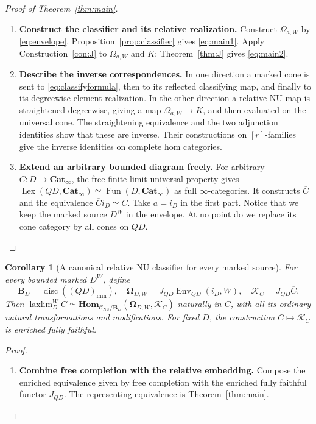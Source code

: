 \documentclass[oneside]{article}
\theoremstyle{plain}
\newtheorem{corollary}[theorem]{Corollary}
\theoremstyle{definition}
\theoremstyle{remark}
\newcommand{\B}{\mathbf B}
\newcommand{\CNU}{\mathcal C_{\mathrm{NU}}}
\newcommand{\Cat}{\mathbf{Cat}_{\infty}}
\newcommand{\Env}{\operatorname{Env}}
\newcommand{\Fun}{\operatorname{Fun}}
\newcommand{\Homc}{\mathbf{Hom}}
\newcommand{\J}{J}
\newcommand{\Lex}{\operatorname{Lex}}
\newcommand{\Om}{\boldsymbol\Omega}
\newcommand{\cK}{\mathcal K}
\newcommand{\disc}{\operatorname{disc}}
\newcommand{\laxlim}{\mathop{\mathrm{laxlim}}}
\newcommand{\minrep}{\mathrm{min}}
\begin{document}
\begin{proof}[Proof of Theorem~\ref{thm:main}]
\leavevmode
\begin{enumerate}
\item \textbf{Construct the classifier and its relative realization.} Construct $\Omega_{a,W}$ by \eqref{eq:envelope}. Proposition~\ref{prop:classifier} gives \eqref{eq:main1}. Apply Construction~\ref{con:J} to $\Omega_{a,W}$ and $K$; Theorem~\ref{thm:J} gives \eqref{eq:main2}.
\item \textbf{Describe the inverse correspondences.} In one direction a marked cone is sent to \eqref{eq:classifyformula}, then to its reflected classifying map, and finally to its degreewise element realization. In the other direction a relative NU map is straightened degreewise, giving a map $\Omega_{a,W}\to K$, and then evaluated on the universal cone. The straightening equivalence and the two adjunction identities show that these are inverse. Their constructions on $[r]$-families give the inverse identities on complete hom categories.
\item \textbf{Extend an arbitrary bounded diagram freely.} For arbitrary $C:D\to\Cat$, the free finite-limit universal property gives $\Lex(QD,\Cat)\simeq\Fun(D,\Cat)$ as full $\infty$-categories. It constructs $\overline C$ and the equivalence $\overline C i_D\simeq C$. Take $a=i_D$ in the first part. Notice that we keep the marked source $D^W$ in the envelope. At no point do we replace its cone category by all cones on $QD$.\qedhere
\end{enumerate}
\end{proof}

\begin{corollary}[A canonical relative NU classifier for every marked source]\label{cor:allmarked}
For every bounded marked $D^W$, define
\[
 \B_D=\disc((QD)_{\minrep}),\quad
 \Om_{D,W}=\J_{QD}\Env_{QD}(i_D,W),\quad
 \cK_C=\J_{QD}\overline C.
\]
Then $\laxlim_D^W C\simeq \Homc_{\CNU/\B_D}(\Om_{D,W},\cK_C)$ naturally in $C$, with all its ordinary natural transformations and modifications. For fixed $D$, the construction $C\mapsto\cK_C$ is enriched fully faithful.
\end{corollary}
\begin{proof}
\leavevmode
\begin{enumerate}
\item \textbf{Combine free completion with the relative embedding.} Compose the enriched equivalence given by free completion with the enriched fully faithful functor $\J_{QD}$. The representing equivalence is Theorem~\ref{thm:main}.\qedhere
\end{enumerate}
\end{proof}
\end{document}
